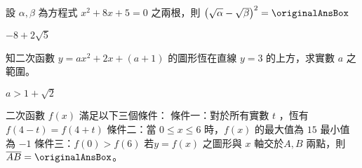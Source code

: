 \begin{QUESTIONS}
\begin{QUESTION}
    \begin{QEMPTYSPACE}
    \end{QEMPTYSPACE}
\end{QUESTION}
\begin{QUESTION}
    \begin{QBODY}
        設 $\alpha ,\beta $ 為方程式 ${{x}^{2}}+8x+5=0$ 之兩根，則 ${{\left( \sqrt{\alpha }-\sqrt{\beta } \right)}^{2}}= \originalAnsBox $
    \end{QBODY}
    \begin{QFROMS}
    \end{QFROMS}
    \begin{QTAGS} \end{QTAGS}
    \begin{QANS}
        $-8+2\sqrt{5}$
    \end{QANS}
    \begin{QSOL}
    \end{QSOL}
    \begin{QEMPTYSPACE}
    \end{QEMPTYSPACE}
\end{QUESTION}
\begin{QUESTION}
    \begin{QBODY}
        知二次函數 $y=a{{x}^{2}}+2x+\left( a+1 \right)$ 的圖形恆在直線 $y=3$ 的上方，求實數 $a$ 之範圍。
    \end{QBODY}
    \begin{QFROMS}
    \end{QFROMS}
    \begin{QTAGS} \end{QTAGS}
    \begin{QANS}
        $a>1+\sqrt{2}$
    \end{QANS}
    \begin{QSOL}
    \end{QSOL}
    \begin{QEMPTYSPACE}
    \end{QEMPTYSPACE}
\end{QUESTION}
\begin{QUESTION}
    \begin{QBODY}
        二次函數 $f\left( x \right)$ 滿足以下三個條件：
        條件一：對於所有實數 $t$ ，恆有 $f\left( 4-t \right)=f\left( 4+t \right)$
        條件二：當 $0\le x\le 6$ 時，$f\left( x \right)$ 的最大值為 $15$ 最小值為 $-1$ 
        條件三：$f\left( 0 \right)>f\left( 6 \right)$
        若$y=f\left( x \right)$ 之圖形與 $x$ 軸交於$A,B$ 兩點，則$\overline{AB}=\originalAnsBox $。
    \end{QBODY}

\end{QUESTION}
\end{QUESTIONS}

